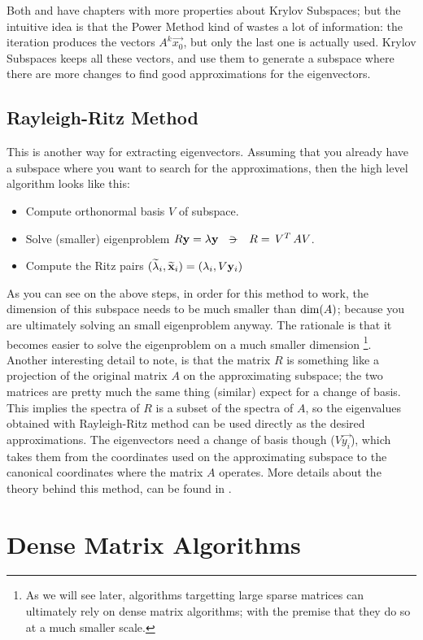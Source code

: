 Both \cite{parlett80} and \cite{saad92} have chapters with more
properties about Krylov Subspaces; but the intuitive idea is that the
Power Method kind of wastes a lot of information: the iteration
produces the vectors $A^k\vec{x_0}$, but only the last one is actually
used. Krylov Subspaces keeps all these vectors, and use them to
generate a subspace where there are more changes to find good
approximations for the eigenvectors.

\subsection{Rayleigh-Ritz Method}

This is another way for extracting eigenvectors. Assuming that you
already have a subspace where you want to search for the
approximations, then the high level algorithm looks like this:

\begin{itemize}
  \item Compute orthonormal basis $V$ of subspace. 
  \item Solve (smaller) eigenproblem $R\vec{y} = \lambda\vec{y}
    \ds{\suchthat} R = \trans{V} A V$. 
  \item Compute the Ritz pairs
      $(\widetilde{\lambda}_i,\widetilde{\mathbf{x}}_i) = (\lambda_i, V\mathbf{y}_i)$
\end{itemize}

As you can see on the above steps, in order for this method to work,
the dimension of this subspace  needs to be much smaller than
$\operatorname{dim}(A)$; because you are ultimately solving an small
eigenproblem anyway.  The rationale is that it becomes easier to
solve the eigenproblem on a much smaller dimension \footnote{As we
  will see later, algorithms targetting large sparse matrices can
  ultimately rely on dense matrix algorithms; with the premise that
  they do so at a much smaller scale.}. \\

Another interesting detail to note, is that the
matrix $R$ is something like a projection of the original matrix $A$
on the approximating subspace; the two matrices are pretty much the
same thing (similar) expect for a change of 
basis. This implies the spectra of $R$ is a subset of the spectra of
$A$, so the eigenvalues obtained with Rayleigh-Ritz method can be used
directly as the desired approximations. The eigenvectors need a change
of basis though ($V\vec{y_i}$), which takes them from the coordinates
used on the approximating subspace to the canonical coordinates where
the matrix $A$ operates. More details about the theory behind this
method, can be found in \cite{saad92}.

\section{Dense Matrix Algorithms}

